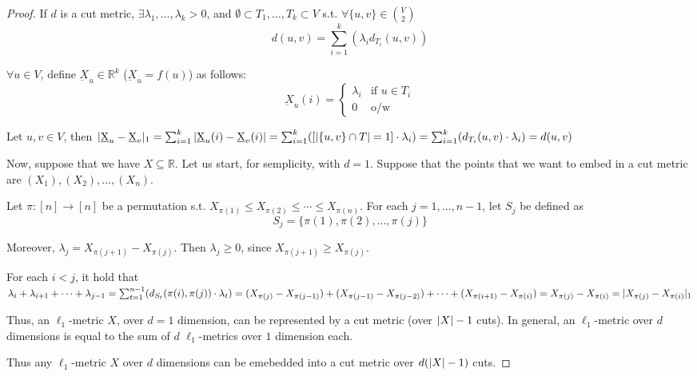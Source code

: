     \begin{proof}
        If $d$ is a cut metric, $\exists \lambda_1, \dots, \lambda_k > 0$, and $\emptyset \subset T_1, \dots, T_k \subset V$ s.t. $\forall \{u,v\} \in \binom{V}{2}$
        \[ d(u,v) = \sum_{i=1}^{k}(\lambda_i d_{T_i}(u,v)) \]

        $\forall u \in V$, define $\underbar{X}_u \in \mathbb{R}^k$ ($\underbar{X}_u = f(u)$) as follows:
        \begin{equation}
            \underbar{X}_u(i) = 
            \begin{cases}
                \lambda_i   & \text{if } u \in T_i\\
                0           & \text{o/w}
            \end{cases}
        \end{equation}

        Let $u,v \in V$, then
        $\vert \underbar{X}_u - \underbar{X}_v \vert_1 =
        \sum_{i=1}^{k}\vert \underbar{X}_u(i) - \underbar{X}_v(i) \vert =
        \sum_{i=1}^{k}([\vert \{u,v\} \cap T \vert = 1] \cdot \lambda_i) =
        \sum_{i=1}^{k}(d_{T_i}(u,v) \cdot \lambda_i) =
        d(u,v)$

        Now, suppose that we have $X \subseteq \mathbb{R}$.
        Let us start, for semplicity, with $d=1$.
        Suppose that the points that we want to embed in a cut metric are $(X_1), (X_2), \dots, (X_n)$.

        Let $\pi : [n] \rightarrow [n]$ be a permutation s.t. $X_{\pi(1)} \leq X_{\pi(2)} \leq \cdots \leq X_{\pi(n)}$.
        For each $j = 1, \dots, n-1$, let $S_j$ be defined as
        \[ S_j = \{ \pi(1), \pi(2), \dots, \pi(j) \} \]

        Moreover, $\lambda_j = X_{\pi(j+1)} - X_{\pi(j)}$.
        Then $\lambda_j \geq 0$, since $X_{\pi(j+1)} \geq X_{\pi(j)}$.

        For each $i < j$, it hold that
        $\lambda_i  + \lambda_{i+1} + \cdots + \lambda_{j-1} = 
        \sum_{t=1}^{n-1}(d_{S_t}(\pi(i), \pi(j)) \cdot \lambda_t) = 
        (X_{\pi(j)} - X_{\pi(j-1)}) + (X_{\pi(j-1)} - X_{\pi(j-2)}) + \cdots + (X_{\pi(i+1)} - X_{\pi(i)}) = 
        X_{\pi(j)} - X_{\pi(i)} = 
        \vert X_{\pi(j)} - X_{\pi(i)} \vert_1$

        Thus, an $\ell_1$-metric $X$, over $d=1$ dimension, can be represented by a cut metric (over $\vert X \vert-1$ cuts).
        In general, an $\ell_1$-metric over $d$ dimensions is equal to the sum of $d$ $\ell_1$-metrics over $1$ dimension each.

        Thus any $\ell_1$-metric $X$ over $d$ dimensions can be emebedded into a cut metric over $d(\vert X \vert-1)$ cuts.
    \end{proof}

